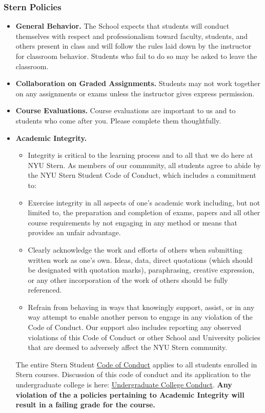\documentclass[12pt,pdftex,twoside,letterpaper]{exam}
\begin{document}
\subsubsection*{Stern Policies}
\begin{itemize}
\item \textbf{General Behavior.} The School expects that students will conduct themselves with respect and professionalism toward faculty, students, and others present in class and will follow the rules laid down by the instructor for classroom behavior.  Students who fail to do so may be asked to leave the classroom.

\item \textbf{Collaboration on Graded Assignments.} Students may not work together on any assignments or exams unless the instructor gives express permission.

\item \textbf{Course Evaluations.} Course evaluations are important to us and to students who come after you.  Please complete them thoughtfully.

\item \textbf{Academic Integrity.}
\begin{itemize}
\item Integrity is critical to the learning process and to all that we do here at NYU Stern. As members of our community, all students agree to abide by the NYU Stern Student Code of Conduct, which includes a commitment to:
\item Exercise integrity in all aspects of one's academic work including, but not limited to, the preparation and completion of exams, papers and all other course requirements by not engaging in any method or means that provides an unfair advantage.
\item Clearly acknowledge the work and efforts of others when submitting written work as one's own. Ideas, data, direct quotations (which should be designated with quotation marks), paraphrasing, creative expression, or any other incorporation of the work of others should be fully referenced.
\item Refrain from behaving in ways that knowingly support, assist, or in any way attempt to enable another person to engage in any violation of the Code of Conduct. Our support also includes reporting any observed violations of this Code of Conduct or other School and University policies that are deemed to adversely affect the NYU Stern community.
\end{itemize}
The entire Stern Student \href{http://www.stern.nyu.edu/sites/default/files/assets/documents/con_039512.pdf}{Code of Conduct} applies to all students enrolled in Stern courses. Discussion of this code of conduct and its application to the undergraduate college is here: \href{http://www.stern.nyu.edu/uc/codeofconduct}{Undergraduate College Conduct}. \textbf{Any violation of the a policies pertaining to Academic Integrity will result in a failing grade for the course.}
\end{itemize}
\end{document}
